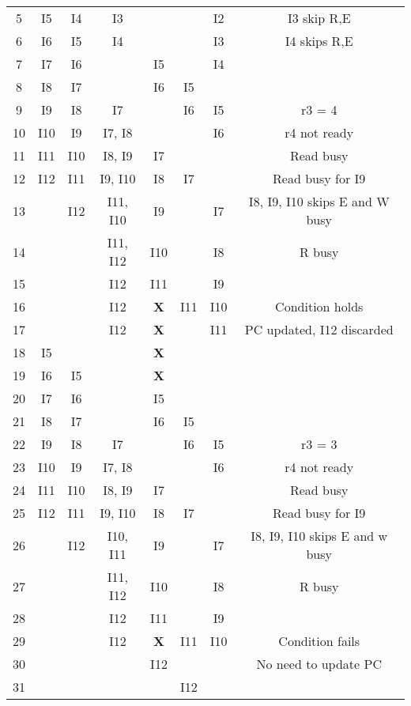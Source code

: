 \documentclass[12pt]{article}
\begin{document}
\begin{enumerate}
\begin{enumerate}
\begin{table}[h!]
\begin{tabular}{||c||c|c|c|c|c|c|c||}
             5 & I5 & I4 & I3 & & & I2 & I3 skip R,E\\  
             6 & I6 & I5 & I4 & & & I3 & I4 skips R,E\\
             7 & I7 & I6 & & I5 & & I4 & \\
             8 & I8 & I7 & & I6 & I5 & & \\
             9 & I9 & I8 & I7 & & I6 & I5 & r3 = 4\\
             10 & I10 & I9 & I7, I8 & & & I6 & r4 not ready\\
             11 & I11 & I10 & I8, I9 & I7 & & & Read busy\\
             12 & I12 & I11 & I9, I10 & I8 & I7 & & Read busy for I9\\
             13 & & I12 & I11, I10 & I9 & & I7 & I8, I9, I10 skips E and W busy\\
             14 & & & I11, I12 & I10 & & I8 & R busy\\
             15 & & & I12 & I11 & & I9 & \\
             16 & & & I12 & \textbf{X} & I11 & I10 & Condition holds\\
             17 & & & I12 & \textbf{X} & & I11 & PC updated, I12 discarded\\
             18 & I5 & & & \textbf{X} & & & \\
             19 & I6 & I5 & & \textbf{X} & & & \\
             20 & I7 & I6 & & I5 & & & \\
             21 & I8 & I7 & & I6 & I5 & & \\
             22 & I9 & I8 & I7 & & I6 & I5 & r3 = 3\\
             23 & I10 & I9 & I7, I8 & & & I6 & r4 not ready\\
             24 & I11 & I10 & I8, I9 & I7 & & & Read busy\\
             25 & I12 & I11 & I9, I10 & I8 & I7 & & Read busy for I9\\
             26 & & I12 & I10, I11 & I9 & & I7 & I8, I9, I10 skips E and w busy\\
             27 & & & I11, I12 & I10 & & I8 & R busy\\
             28 & & & I12 & I11 & & I9 & \\
             29 & & & I12 & \textbf{X} & I11 & I10 & Condition fails\\
             30 & & & & I12 & & & No need to update PC\\
             31 & & & & & I12 & & \\

\end{tabular}
\end{table}
\end{enumerate}
\end{enumerate}
\end{document}
